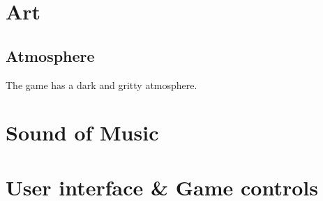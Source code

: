 \documentclass{article}
\begin{document}
\section{Art}
	\subsection{Atmosphere}
		The game has a dark and gritty atmosphere.

\section{Sound of Music}

\section{User interface \& Game controls}
\end{document}
